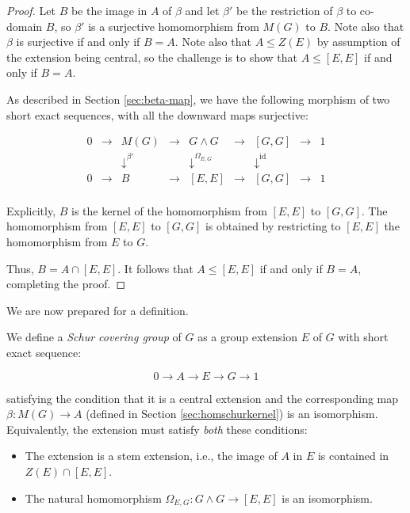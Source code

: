 \documentclass{ucetd}
\begin{document}
\begin{proof}
  Let $B$ be the image in $A$ of $\beta$ and let $\beta'$ be the
  restriction of $\beta$ to co-domain $B$, so $\beta'$ is a surjective
  homomorphism from $M(G)$ to $B$. Note also that $\beta$ is
  surjective if and only if $B = A$. Note also that $A \le Z(E)$ by
  assumption of the extension being central, so the challenge is to
  show that $A \le [E,E]$ if and only if $B = A$.

  As described in Section \ref{sec:beta-map}, we have the following
  morphism of two short exact sequences, with all the downward maps
  surjective:

  $$\begin{array}{ccccccccc}
    0 & \to & M(G) & \to & G \wedge G & \to & [G,G] & \to & 1\\
    &&   \downarrow^{\beta'}  &&  \downarrow^{\Omega_{E,G}}     && \downarrow^{\text{id}} && \\
    0 & \to & B &\to & [E,E] & \to & [G,G] & \to & 1\\
  \end{array}$$

  Explicitly, $B$ is the kernel of the homomorphism from $[E,E]$ to
  $[G,G]$. The homomorphism from $[E,E]$ to $[G,G]$ is obtained by
  restricting to $[E,E]$ the homomorphism from $E$ to $G$. 

  Thus, $B = A \cap [E,E]$. It follows that $A \le [E,E]$ if and only
  if $B = A$, completing the proof.
\end{proof}

We are now prepared for a definition.

\begin{definer}
  We define a {\em Schur covering group} of $G$ as a group
  extension $E$ of $G$ with short exact sequence:

  $$0 \to A \to E \to G \to 1$$
  
  satisfying the condition that it is a central extension and the
  corresponding map $\beta: M(G) \to A$ (defined in Section
  \ref{sec:homschurkernel}) is an isomorphism. Equivalently, the
  extension must satisfy {\em both} these conditions:
  
  \begin{itemize}
  \item The extension is a stem extension, i.e., the image of $A$ in $E$
    is contained in $Z(E) \cap [E,E]$.
  \item The natural homomorphism $\Omega_{E,G}: G \wedge G \to [E,E]$ is an
    isomorphism.
  \end{itemize}
\end{definer}
  
\end{document}
